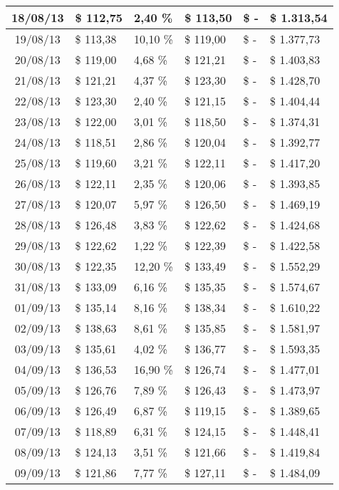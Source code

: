 \begin{small}
\begin{longtable}{|c|l|l|l|l|l|}
18/08/13 & \$ 112,75 & 2,40 \% & \$ 113,50 & \$ - & \$ 1.313,54 \\ \hline
19/08/13 & \$ 113,38 & 10,10 \% & \$ 119,00 & \$ - & \$ 1.377,73 \\ \hline
20/08/13 & \$ 119,00 & 4,68 \% & \$ 121,21 & \$ - & \$ 1.403,83 \\ \hline
21/08/13 & \$ 121,21 & 4,37 \% & \$ 123,30 & \$ - & \$ 1.428,70 \\ \hline
22/08/13 & \$ 123,30 & 2,40 \% & \$ 121,15 & \$ - & \$ 1.404,44 \\ \hline
23/08/13 & \$ 122,00 & 3,01 \% & \$ 118,50 & \$ - & \$ 1.374,31 \\ \hline
24/08/13 & \$ 118,51 & 2,86 \% & \$ 120,04 & \$ - & \$ 1.392,77 \\ \hline
25/08/13 & \$ 119,60 & 3,21 \% & \$ 122,11 & \$ - & \$ 1.417,20 \\ \hline
26/08/13 & \$ 122,11 & 2,35 \% & \$ 120,06 & \$ - & \$ 1.393,85 \\ \hline
27/08/13 & \$ 120,07 & 5,97 \% & \$ 126,50 & \$ - & \$ 1.469,19 \\ \hline
28/08/13 & \$ 126,48 & 3,83 \% & \$ 122,62 & \$ - & \$ 1.424,68 \\ \hline
29/08/13 & \$ 122,62 & 1,22 \% & \$ 122,39 & \$ - & \$ 1.422,58 \\ \hline
30/08/13 & \$ 122,35 & 12,20 \% & \$ 133,49 & \$ - & \$ 1.552,29 \\ \hline
31/08/13 & \$ 133,09 & 6,16 \% & \$ 135,35 & \$ - & \$ 1.574,67 \\ \hline
01/09/13 & \$ 135,14 & 8,16 \% & \$ 138,34 & \$ - & \$ 1.610,22 \\ \hline
02/09/13 & \$ 138,63 & 8,61 \% & \$ 135,85 & \$ - & \$ 1.581,97 \\ \hline
03/09/13 & \$ 135,61 & 4,02 \% & \$ 136,77 & \$ - & \$ 1.593,35 \\ \hline
04/09/13 & \$ 136,53 & 16,90 \% & \$ 126,74 & \$ - & \$ 1.477,01 \\ \hline
05/09/13 & \$ 126,76 & 7,89 \% & \$ 126,43 & \$ - & \$ 1.473,97 \\ \hline
06/09/13 & \$ 126,49 & 6,87 \% & \$ 119,15 & \$ - & \$ 1.389,65 \\ \hline
07/09/13 & \$ 118,89 & 6,31 \% & \$ 124,15 & \$ - & \$ 1.448,41 \\ \hline
08/09/13 & \$ 124,13 & 3,51 \% & \$ 121,66 & \$ - & \$ 1.419,84 \\ \hline
09/09/13 & \$ 121,86 & 7,77 \% & \$ 127,11 & \$ - & \$ 1.484,09 \\ \hline

\end{longtable}
\end{small}
